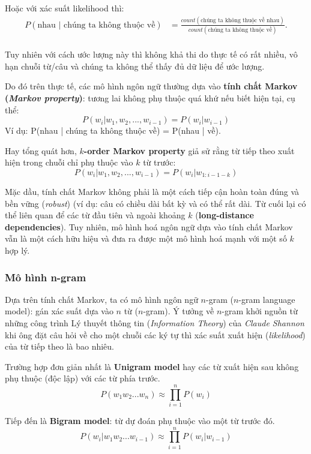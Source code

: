 Hoặc với xác suất likelihood thì:
\begin{equation}
\begin{split}
P(\text{nhau | chúng ta không thuộc về})&=\frac{count(\text{chúng ta không thuộc về nhau})}{count(\text{chúng ta không thuộc về})}.\\
\end{split}
\end{equation}

Tuy nhiên với cách ước lượng này thì không khả thi do thực tế có rất nhiều, vô hạn chuỗi từ/câu  và chúng ta không thể thấy đủ dữ liệu để ước lượng.

Do đó trên thực tế, các mô hình ngôn ngữ thường dựa vào \textbf{tính chất Markov (\textit{Markov property})}: tương lai không phụ thuộc quá khứ nếu biết hiện tại, cụ thể:
$$P(w_i|w_1,w_2,...,w_{i-1})=P(w_i|w_{i-1})$$
Ví dụ: P(nhau | chúng ta không thuộc về) = P(nhau | về).

Hay tổng quát hơn, \textbf{$k$-order Markov property} giả sử rằng từ tiếp theo xuất hiện trong chuỗi chỉ phụ thuộc vào $k$ từ trước:
$$P(w_i|w_1,w_2,...,w_{i-1})=P(w_i|w_{1:i-1-k})$$

Mặc dầu, tính chất Markov không phải là một cách tiếp cận hoàn toàn đúng và bền vững (\textit{robust}) (ví dụ: câu có chiều dài bất kỳ và có thể rất dài. Từ cuối lại có thể liên quan để các từ đầu tiên và ngoài khoảng $k$ (\textbf{long-distance dependencies}). Tuy nhiên, mô hình hoá ngôn ngữ dựa vào tính chất Markov vẫn là một cách hữu hiệu và đưa ra được một mô hình hoá mạnh với một số $k$ hợp lý.

\subsubsection{Mô hình n-gram}
Dựa trên tính chất Markov, ta có mô hình ngôn ngữ $n$-gram ($n$-gram language model): gán xác suất dựa vào $n$ từ ($n$-gram). Ý tưởng về $n$-gram khởi nguồn từ những công trình Lý thuyết thông tin (\textit{Information Theory}) của \textit{Claude Shannon} khi ông đặt câu hỏi về cho một chuỗi các ký tự thì xác suất xuất hiện (\textit{likelihood}) của từ tiếp theo là bao nhiêu.


Trường hợp đơn giản nhất là \textbf{Unigram model} hay các từ xuất hiện sau không phụ thuộc (độc lập) với các từ phía trước.
$$P(w_1w_2...w_n)\approx\prod_{i=1}^{n} P(w_i)$$

Tiếp đến là \textbf{Bigram model}: từ dự đoán phụ thuộc vào một từ trước đó.
$$P(w_i|w_1w_2...w_{i-1})\approx\prod_{i=1}^{n} P(w_i|w_{i-1})$$


